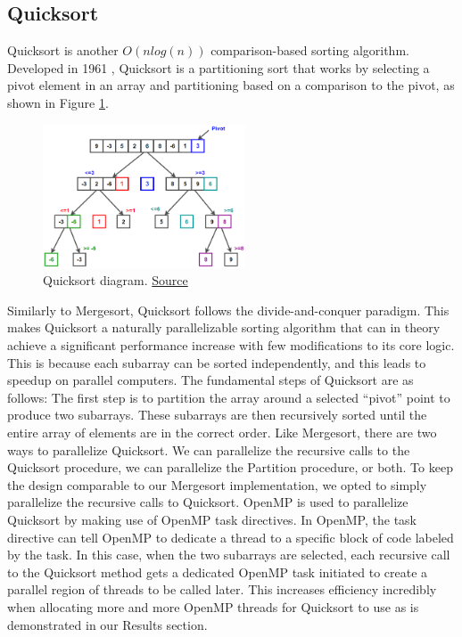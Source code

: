 \documentclass[conference]{IEEEtran}
\begin{document}
	\subsection{Quicksort}
	Quicksort is another $O(nlog(n))$ comparison-based sorting algorithm.
	Developed in 1961 \cite{hoare_algorithm_1961}, Quicksort is a partitioning sort that works by selecting a pivot element in an array and partitioning based on a comparison to the pivot, as shown in Figure \ref{qck}.
	\begin{figure}[h]
		\includegraphics[width=6cm]{Quicksort.png}
		\caption{Quicksort diagram. \href{https://www.techiedelight.com/quicksort/}{Source}}
		\label{qck}
	\end{figure}
	Similarly to Mergesort, Quicksort follows the divide-and-conquer paradigm. This makes Quicksort a naturally parallelizable sorting algorithm that can in theory achieve a significant performance increase with few modifications to its core logic. \cite{blelloch_programming_1996}
	This is because each subarray can be sorted independently, and this leads to speedup on parallel computers.
	The fundamental steps of Quicksort are as follows: The first step is to partition the array around a selected “pivot” point to produce two subarrays. These subarrays are then recursively sorted until the entire array of elements are in the correct order. Like Mergesort, there are two ways to parallelize Quicksort.
	We can parallelize the recursive calls to the Quicksort procedure, we can parallelize the Partition procedure, or both. To keep the design comparable to our Mergesort implementation, we opted to simply parallelize the recursive calls to Quicksort. OpenMP is used to parallelize Quicksort by making use of
	OpenMP task directives. In OpenMP, the task directive can tell OpenMP to dedicate a
	thread to a specific block of code labeled by the task. In this case, when the two subarrays are selected, each recursive call to the Quicksort method gets a dedicated OpenMP task initiated to create a parallel region of threads to be called later. This increases efficiency incredibly when allocating more and more OpenMP threads for Quicksort to use as is demonstrated in our Results section.
\end{document}
